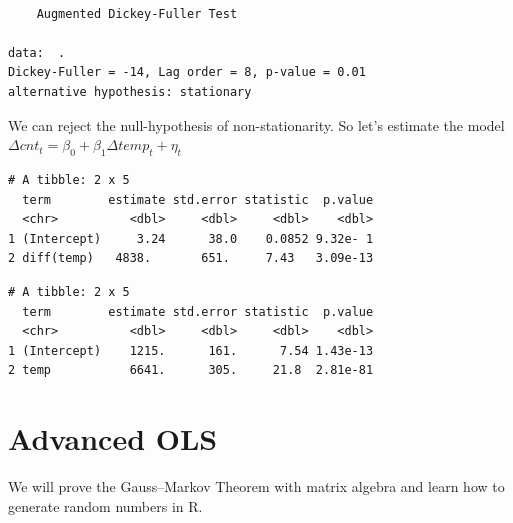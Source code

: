 \documentclass[]{book}
\newenvironment{Shaded}{\begin{snugshade}}{\end{snugshade}}
\newcommand{\CommentTok}[1]{\textcolor[rgb]{0.56,0.35,0.01}{\textit{#1}}}
\newcommand{\KeywordTok}[1]{\textcolor[rgb]{0.13,0.29,0.53}{\textbf{#1}}}
\newcommand{\NormalTok}[1]{#1}
\newcommand{\OperatorTok}[1]{\textcolor[rgb]{0.81,0.36,0.00}{\textbf{#1}}}
\newcommand{\StringTok}[1]{\textcolor[rgb]{0.31,0.60,0.02}{#1}}
\begin{document}
\begin{verbatim}

    Augmented Dickey-Fuller Test

data:  .
Dickey-Fuller = -14, Lag order = 8, p-value = 0.01
alternative hypothesis: stationary
\end{verbatim}

We can reject the null-hypothesis of non-stationarity. So let's estimate the model \(\Delta cnt_t=\beta_0+\beta_1\Delta temp_t+\eta_t\)

\begin{Shaded}
\end{Shaded}

\begin{verbatim}
# A tibble: 2 x 5
  term        estimate std.error statistic  p.value
  <chr>          <dbl>     <dbl>     <dbl>    <dbl>
1 (Intercept)     3.24      38.0    0.0852 9.32e- 1
2 diff(temp)   4838.       651.     7.43   3.09e-13
\end{verbatim}

\begin{Shaded}
\end{Shaded}

\begin{verbatim}
# A tibble: 2 x 5
  term        estimate std.error statistic  p.value
  <chr>          <dbl>     <dbl>     <dbl>    <dbl>
1 (Intercept)    1215.      161.      7.54 1.43e-13
2 temp           6641.      305.     21.8  2.81e-81
\end{verbatim}

\hypertarget{chp14}{%
\chapter{Advanced OLS}\label{chp14}}

We will prove the Gauss--Markov Theorem with matrix algebra and learn how to generate random numbers in R.
\end{document}
